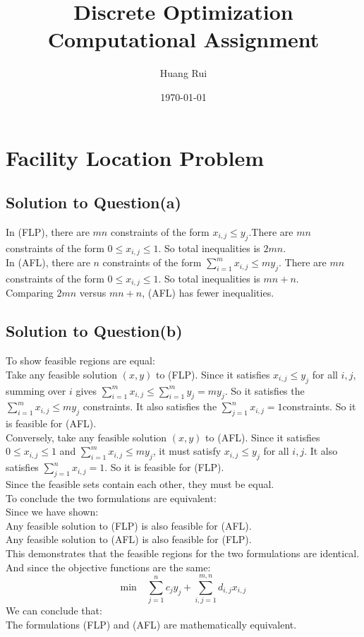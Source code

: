 \documentclass[a4paper]{article}
\title{Discrete Optimization Computational Assignment}
\author{Huang Rui}
\date{\today}
\begin{document}
\maketitle

\section{Facility Location Problem}
\subsection{Solution to Question(a)}
In (FLP), there are $mn$ constraints of the form $x_{i,j} \leq y_j$.There are $mn$ constraints of the form $0\leq x_{i,j}\leq 1$. So total inequalities is $2mn$. \\
In (AFL), there are $n$ constraints of the form $\sum\limits_{i=1}^m x_{i,j} \leq my_j$. There are $mn$ constraints of the form $0\leq x_{i,j}\leq 1$. So total inequalities is $mn+n$.\\
Comparing $2mn$ versus $mn+n$, (AFL) has fewer inequalities.

\subsection{Solution to Question(b)}
To show feasible regions are equal:\\
Take any feasible solution $(x,y)$ to (FLP). Since it satisfies $x_{i,j} \leq y_j$ for all $i,j$, summing over $i$ gives $\sum\limits_{i=1}^m x_{i,j} \leq \sum\limits_{i=1}^m y_j = my_j$. So it satisfies the $\sum\limits_{i=1}^m x_{i,j} \leq my_j$ constraints. It also satisfies the $\sum\limits_{j=1}^n x_{i,j} = 1 $constraints. So it is feasible for (AFL).\\
Conversely, take any feasible solution $(x,y)$ to (AFL). Since it satisfies $0 \leq x_{i,j} \leq 1$ and $\sum\limits_{i=1}^m x_{i,j} \leq my_j$, it must satisfy $x_{i,j} \leq y_j$ for all $i,j$. It also satisfies $\sum\limits_{j=1}^n x_{i,j} = 1 $. So it is feasible for (FLP).\\
Since the feasible sets contain each other, they must be equal.\\
To conclude the two formulations are equivalent:\\
Since we have shown:\\
Any feasible solution to (FLP) is also feasible for (AFL).\\
Any feasible solution to (AFL) is also feasible for (FLP).\\
This demonstrates that the feasible regions for the two formulations are identical.\\
And since the objective functions are the same:\\
\begin{equation*}
    \text{min} \quad \sum_{j=1}^n c_jy_j+\sum_{i,j=1}^{m,n} d_{i,j}x_{i,j}
\end{equation*}
We can conclude that:\\
The formulations (FLP) and (AFL) are mathematically equivalent.\\
\end{document}
